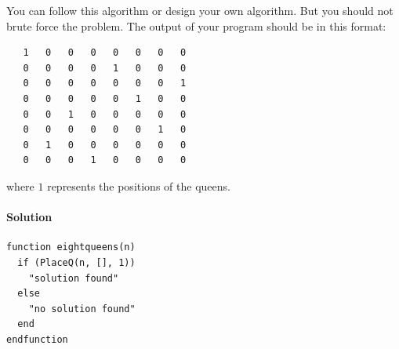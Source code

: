 \documentclass[12pt,a4paper,hidelinks,fleqn]{article}            %
\begin{document}
You can follow this algorithm or design your own algorithm.
But you should not brute force the problem.
The output of your program should be in this format:
\begin{verbatim}
   1   0   0   0   0   0   0   0
   0   0   0   0   1   0   0   0
   0   0   0   0   0   0   0   1
   0   0   0   0   0   1   0   0
   0   0   1   0   0   0   0   0
   0   0   0   0   0   0   1   0
   0   1   0   0   0   0   0   0
   0   0   0   1   0   0   0   0
\end{verbatim}
where $1$ represents the positions of the queens.

\paragraph{Solution}
\begin{verbatim}
function eightqueens(n)                                                                                                                      
  if (PlaceQ(n, [], 1))                                                                                                                      
    "solution found"                                                                                                                         
  else                                                                                                                                       
    "no solution found"                                                                                                                      
  end                                                                                                                                        
endfunction                                                                                                                                  
                                                                                                                                             

\end{verbatim}
\end{document}
